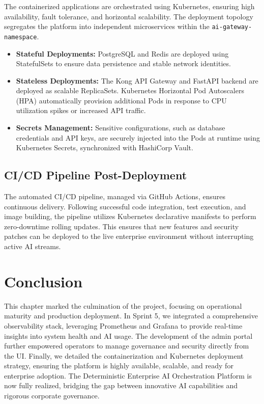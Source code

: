 The containerized applications are orchestrated using Kubernetes, ensuring high availability, fault tolerance, and horizontal scalability. The deployment topology segregates the platform into independent microservices within the \texttt{ai-gateway-namespace}.

\begin{itemize}
    \item \textbf{Stateful Deployments:} PostgreSQL and Redis are deployed using StatefulSets to ensure data persistence and stable network identities.
    \item \textbf{Stateless Deployments:} The Kong API Gateway and FastAPI backend are deployed as scalable ReplicaSets. Kubernetes Horizontal Pod Autoscalers (HPA) automatically provision additional Pods in response to CPU utilization spikes or increased API traffic.
    \item \textbf{Secrets Management:} Sensitive configurations, such as database credentials and API keys, are securely injected into the Pods at runtime using Kubernetes Secrets, synchronized with HashiCorp Vault.
\end{itemize}

\subsection{CI/CD Pipeline Post-Deployment}

The automated CI/CD pipeline, managed via GitHub Actions, ensures continuous delivery. Following successful code integration, test execution, and image building, the pipeline utilizes Kubernetes declarative manifests to perform zero-downtime rolling updates. This ensures that new features and security patches can be deployed to the live enterprise environment without interrupting active AI streams.


\section*{Conclusion}

This chapter marked the culmination of the project, focusing on operational maturity and production deployment. In Sprint 5, we integrated a comprehensive observability stack, leveraging Prometheus and Grafana to provide real-time insights into system health and AI usage. The development of the admin portal further empowered operators to manage governance and security directly from the UI. Finally, we detailed the containerization and Kubernetes deployment strategy, ensuring the platform is highly available, scalable, and ready for enterprise adoption. The Deterministic Enterprise AI Orchestration Platform is now fully realized, bridging the gap between innovative AI capabilities and rigorous corporate governance.
